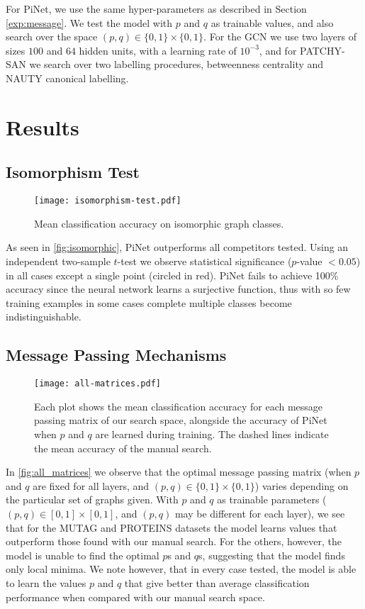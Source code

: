 \documentclass{article}
\theoremstyle{definition}
\begin{document}
For PiNet, we use the same hyper-parameters as described in Section \ref{exp:message}. We test the model with $p$ and $q$ as trainable values, and also search over the space $(p, q) \in \{0, 1\} \times \{0, 1\}$. For the GCN we use two layers of sizes $100$ and $64$ hidden units, with a learning rate of $10^{-3}$, and for PATCHY-SAN we search over two labelling procedures, betweenness centrality \cite{Brandes2001} and NAUTY \cite{Mckay2013} canonical labelling.

\section{Results}

\subsection{Isomorphism Test}

\begin{figure}[ht]
  \centering
  \texttt{[image: isomorphism-test.pdf]}
  \caption{Mean classification accuracy on isomorphic graph classes.}
  \label{fig:isomorphic}
\end{figure}

As seen in \autoref{fig:isomorphic}, PiNet outperforms all competitors tested. Using an independent two-sample $t$-test we observe statistical significance ($p$-value $< 0.05$) in all cases except a single point (circled in red). PiNet fails to achieve 100\% accuracy since the neural network learns a surjective function, thus with so few training examples in some cases complete multiple classes become indistinguishable. 

\subsection{Message Passing Mechanisms}

\begin{figure}[ht]
  \centering
  \texttt{[image: all-matrices.pdf]}
  \caption{Each plot shows the mean classification accuracy for each message passing matrix of our search space, alongside the accuracy of PiNet when $p$ and $q$ are learned during training. The dashed lines indicate the mean accuracy of the manual search.}
  \label{fig:all_matrices}
\end{figure}

In \autoref{fig:all_matrices} we observe that the optimal message passing matrix (when $p$ and $q$ are fixed for all layers, and $(p, q) \in \{0, 1\} \times \{0, 1\}$) varies depending on the particular set of graphs given. With $p$ and $q$ as trainable parameters ($(p, q) \in [0, 1] \times [0, 1]$, and $(p, q)$ may be different for each layer), we see that for the MUTAG and PROTEINS datasets the model learns values that outperform those found with our manual search. For the others, however, the model is unable to find the optimal $p$s and $q$s, suggesting that the model finds only local minima. We note however, that in every case tested, the model is able to learn the values $p$ and $q$ that give better than average classification performance when compared with our manual search space.
\end{document}
